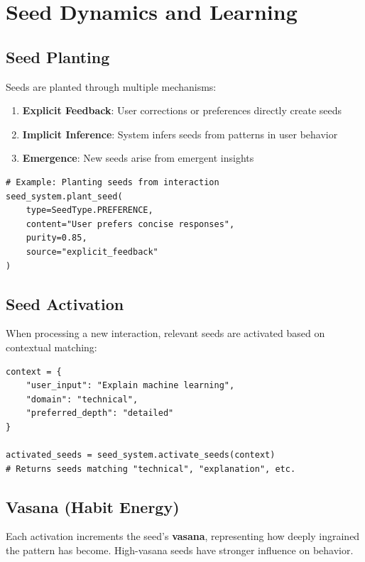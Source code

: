 \documentclass[11pt, a4paper]{article}
\begin{document}
\section{Seed Dynamics and Learning}

\subsection{Seed Planting}

Seeds are planted through multiple mechanisms:

\begin{enumerate}
    \item \textbf{Explicit Feedback}: User corrections or preferences directly create seeds
    \item \textbf{Implicit Inference}: System infers seeds from patterns in user behavior
    \item \textbf{Emergence}: New seeds arise from emergent insights
\end{enumerate}

\begin{lstlisting}[style=python, caption={Planting Seeds Example}]
# Example: Planting seeds from interaction
seed_system.plant_seed(
    type=SeedType.PREFERENCE,
    content="User prefers concise responses",
    purity=0.85,
    source="explicit_feedback"
)
\end{lstlisting}

\subsection{Seed Activation}

When processing a new interaction, relevant seeds are activated based on contextual matching:

\begin{lstlisting}[style=python, caption={Activating Seeds Example}]
context = {
    "user_input": "Explain machine learning",
    "domain": "technical",
    "preferred_depth": "detailed"
}

activated_seeds = seed_system.activate_seeds(context)
# Returns seeds matching "technical", "explanation", etc.
\end{lstlisting}

\subsection{Vasana (Habit Energy)}

Each activation increments the seed's \textbf{vasana}, representing how deeply ingrained the pattern has become. High-vasana seeds have stronger influence on behavior.
\end{document}
